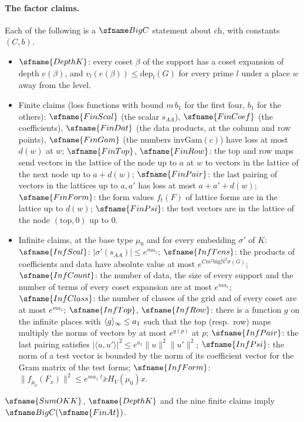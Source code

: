 \paragraph{The factor claims.} Each of the following is a $\fitBigC$ statement about $\mathrm{ch}$, with constants $(C,b)$.
\begin{itemize}
\item $\sfname{DepthK}$: every coset $\beta$ of the support has a coset expansion of depth $e(\beta)$, and $v_l(e(\beta))\le
\mathrm{dep}_l(G)$ for every prime $l$ under a place $w$ away from the level.
\item Finite claims (loss functions with bound $m\,b_1$ for the first four, $b_1$ for the others): $\sfname{FinScal}$ (the scalar
$s_{AA}$), $\sfname{FinCoef}$ (the coefficients), $\sfname{FinDat}$ (the data products, at the column and row points),
$\sfname{FinGam}$ (the numbers $\mathrm{invGam}(c)$) have loss at most $d(w)$ at $w$; $\sfname{FinTop}$, $\sfname{FinRow}$: the
top and row maps send vectors in the lattice of the node up to $a$ at $w$ to vectors in the lattice of the next node up to
$a+d(w)$; $\sfname{FinPair}$: the last pairing of vectors in the lattices up to $a,a'$ has loss at most $a+a'+d(w)$;
$\sfname{FinForm}$: the form values $f_t(F)$ of lattice forms are in the lattice up to $d(w)$; $\sfname{FinPsi}$: the test
vectors are in the lattice of the node $(\mathrm{top},0)$ up to $0$.
\item Infinite claims, at the base type $\mu_0$ and for every embedding $\sigma'$ of $K$: $\sfname{InfScal}$:
$|\sigma'(s_{AA})|\le e^{ma_1}$; $\sfname{InfTens}$: the products of coefficients and data have absolute value at most
$e^{Cm^2\mathrm{bigN}^2\sigma(G)}$; $\sfname{InfCount}$: the number of data, the size of every support and the number of terms of
every coset expansion are at most $e^{ma_1}$; $\sfname{InfClass}$: the number of classes of the grid and of every coset are at
most $e^{ma_1}$; $\sfname{InfTop}$, $\sfname{InfRow}$: there is a function $g$ on the infinite places with $\langle g\rangle_{\infty}\le a_1$
such that the top (resp.\ row) maps multiply the norms of vectors by at most $e^{g(p)}$ at $p$; $\sfname{InfPair}$: the last
pairing satisfies $|\langle u,u'\rangle|^2\le e^{a_1}\|u\|^2\|u'\|^2$; $\sfname{InfPsi}$: the norm of a test vector is bounded by
the norm of its coefficient vector for the Gram matrix of the test forms; $\sfname{InfForm}$:
$\|f_{\mu_0}(F_x)\|^2\le e^{ma_1}\,{}^t\bar x H_V(\mu_0)x$.
\end{itemize}

\begin{theorem}\label{pf:fit:finasm}
$\sfname{SumOKK}$, $\sfname{DepthK}$ and the nine finite claims imply $\fitBigC(\sfname{FinAt})$.
\end{theorem}

